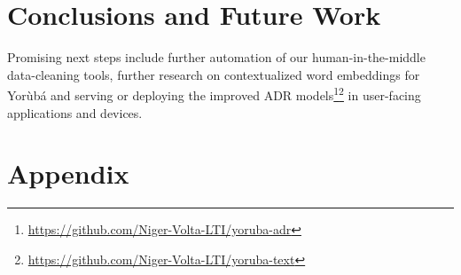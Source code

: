 \documentclass{article} %
\begin{document}
\section{Conclusions and Future Work}

Promising next steps include further automation of our human-in-the-middle data-cleaning tools, further research on contextualized word embeddings for Yor{\`u}b{\'a} and serving or deploying the improved ADR models\footnote{\url{https://github.com/Niger-Volta-LTI/yoruba-adr}}\footnote{\url{https://github.com/Niger-Volta-LTI/yoruba-text}} in user-facing applications and devices.  





\clearpage

\appendix
\section{Appendix}\label{sec:appendix}
\end{document}
